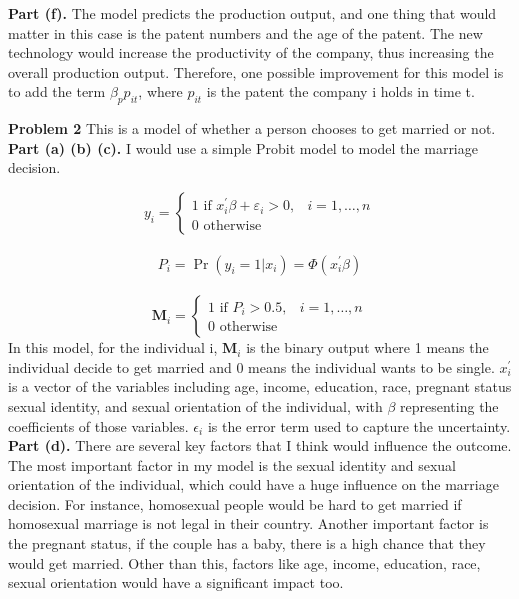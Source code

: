 \documentclass[letterpaper,12pt]{article}
\theoremstyle{definition}
\begin{document}
\textbf{Part (f).} 
The model predicts the production output, and one thing that would matter in this case is the patent numbers and the age of the patent. The new technology would increase the productivity of the company, thus increasing the overall production output. 
Therefore, one possible improvement for this model is to add the term $\beta_{p} p_{i t}$, where $p_{i t}$ is the patent the company i holds in time t.
\\
\newpage

\noindent\textbf{Problem 2}
This is a model of whether a person chooses to get married or not.\\

\textbf{Part (a) (b) (c).} I would use a simple Probit model to model the marriage decision.

$$
y_{i}=\left\{\begin{array}{ll}{1 \text { if } x_{i}^{\prime} \beta+\varepsilon_{i}>0,} & {i=1, \ldots, n} \\ {0 \text { otherwise }}\end{array}\right.
$$
\
$$
P_{i} = {\operatorname{Pr}\left(y_{i}=1 | x_{i}\right)=\Phi\left(x_{i}^{\prime} \beta\right)} 
$$
\
$$
\mathbf{M}_{i} = \left\{\begin{array}{ll}{1 \text { if } P_{i}>0.5,} & {i=1, \ldots, n} \\ {0 \text { otherwise }}\end{array}\right.
$$
In this model, for the individual i, $\mathbf{M}_{i}$ is the binary output where 1 means the individual decide to get married and 0 means the individual wants to be single. $x_{i}^{\prime}$ is a vector of the variables including age, income, education, race, pregnant status sexual identity, and sexual orientation of the individual, with $\beta$ representing the coefficients of those variables. $\epsilon_{i}$ is the error term used to capture the uncertainty.
\\

\textbf{Part (d).} 
There are several key factors that I think would influence the outcome. The most important factor in my model is the sexual identity and sexual orientation of the individual, which could have a huge influence on the marriage decision. For instance, homosexual people would be hard to get married if homosexual marriage is not legal in their country. Another important factor is the pregnant status, if the couple has a baby, there is a high chance that they would get married. Other than this, factors like age, income, education, race, sexual orientation would have a significant impact too.
\\
\end{document}
